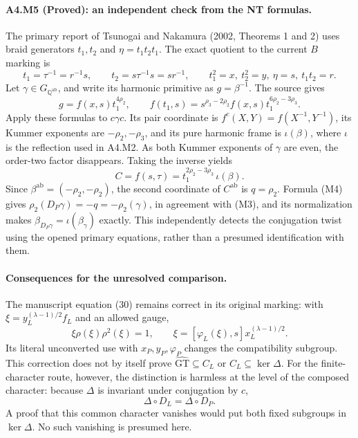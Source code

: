 \paragraph{A4.M5 (Proved): an independent check from the NT formulas.}
The primary report of Tsunogai and Nakamura (2002, Theorems 1 and 2)
uses braid generators $t_1,t_2$ and $\eta=t_1t_2t_1$.
The exact quotient to the current $B$ marking is
\[
 t_1=\tau^{-1}=r^{-1}s,\qquad t_2=s\tau^{-1}s=sr^{-1},
 \qquad t_1^2=x,\ t_2^2=y,\ \eta=s,\ t_1t_2=r.
\]
Let $\gamma\in G_{\mathbb Q^{\mathrm{ab}}}$, and write its harmonic
primitive as $g=\beta^{-1}$. The source gives
\[
 g=f(x,s)t_1^{4\rho_2},\qquad
 f(t_1,s)=s^{\rho_3-2\rho_2}f(x,s)t_1^{6\rho_2-3\rho_3}.
\]
Apply these formulas to $c\gamma c$. Its pair coordinate is
$f^c(X,Y)=f(X^{-1},Y^{-1})$, its Kummer exponents are
$-\rho_2,-\rho_3$, and its pure harmonic frame is $\iota(\beta)$,
where $\iota$ is the reflection used in A4.M2. As both Kummer
exponents of $\gamma$ are even, the order-two factor disappears.
Taking the inverse yields
\[
 C=f(s,\tau)
    =t_1^{2\rho_2-3\rho_3}\,\iota(\beta).
\]
Since $\beta^{\mathrm{ab}}=(-\rho_2,-\rho_2)$, the second
coordinate of $C^{\mathrm{ab}}$ is $q=\rho_2$.
Formula (M4) gives $\rho_2(D_P\gamma)=-q=-\rho_2(\gamma)$,
in agreement with (M3), and its normalization makes
$\beta_{D_P\gamma}=\iota(\beta_\gamma)$ exactly.
This independently detects the conjugation twist using the opened
primary equations, rather than a presumed identification with them.

\paragraph{Consequences for the unresolved comparison.}
The manuscript equation (30) remains correct in its original marking:
with $\xi=y_L^{(\lambda-1)/2}f_L$ and an allowed gauge,
\[
 \xi\rho(\xi)\rho^2(\xi)=1,\qquad
 \xi=[\varphi_L(\xi),s]x_L^{(\lambda-1)/2}.
\]
Its literal unconverted use with $x_P,y_P,\varphi_P$ changes the
compatibility subgroup. This correction does not by itself prove
$\widehat{\mathrm{GT}}\subseteq C_L$ or $C_L\subseteq\ker\Delta$.
For the finite-character route, however, the distinction is harmless
at the level of the composed character: because $\Delta$ is invariant
under conjugation by $c$,
\[
                         \Delta\circ D_L=\Delta\circ D_P.
\]
A proof that this common character vanishes would put both fixed
subgroups in $\ker\Delta$. No such vanishing is presumed here.

